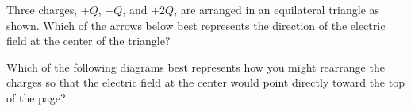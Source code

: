 \documentclass{../../../oss-ap12ibhl}
\begin{document}
\begin{questions}
  \question Three charges, $+Q$, $-Q$, and $+2Q$, are arranged in an
  equilateral triangle as shown. Which of the arrows below best represents the
  direction of the electric field at the center of the triangle?

  \begin{minipage}{.3\linewidth}
  \end{minipage}
  \begin{minipage}{.6\linewidth}
    \begin{oneparchoices}
      \choice {\huge$\downarrow$}
      \choice {\huge$\uparrow$}
      \choice {\huge$\searrow$}
      \choice {\huge$\swarrow$}
      \choice {\huge$\nearrow$}
    \end{oneparchoices}
  \end{minipage}
  \vspace{.25in}
  
  \question Which of the following diagrams best represents how you might
  rearrange the charges so that the electric field at the center would point
  directly toward the top of the page?


\end{questions}
\end{document}
